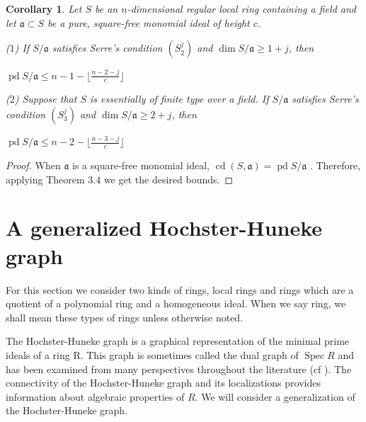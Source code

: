 \documentclass[11pt]{amsart}
\numberwithin{equation}{section}
\newtheorem{cor}[theorem]{Corollary}
\theoremstyle{definition}
\theoremstyle{remark}
\newcommand{\Spec}{\operatorname{Spec}}
\newcommand{\cd}{\operatorname{cd}}
\newcommand{\pd}{\operatorname{pd}}
\begin{document}

\begin{cor}
Let $S$ be an $n$-dimensional regular local ring containing a field and let $\mathfrak{a} \subset S$ be a pure, square-free monomial ideal of height $c$.

($1$) If $S/\mathfrak{a}$ satisfies Serre's condition $(S_2^j)$ and $\dim S/\mathfrak{a} \geq 1+j$, then

\begin{center}
$\pd S/\mathfrak{a} \leq n-1-\lfloor \frac{n-2-j}{c} \rfloor$
\end{center}

($2$) Suppose that $S$ is essentially of finite type over a field. If $S/\mathfrak{a}$ satisfies Serre's condition $(S_3^j)$ and $\dim S/\mathfrak{a} \geq 2+j$, then

\begin{center}
$\pd S/\mathfrak{a} \leq n-2-\lfloor \frac{n-3-j}{c} \rfloor$
\end{center}

\end{cor}

\begin{proof}

When $\mathfrak{a}$ is a square-free monomial ideal, $\cd (S,\mathfrak{a}) = \pd S/\mathfrak{a}$ \cite{Ly83}. Therefore, applying Theorem $3.4$ we get the desired bounds.
\end{proof}

\section{A generalized Hochster-Huneke graph}

For this section we consider two kinds of rings, local rings and rings which are a quotient of a polynomial ring and a homogeneous ideal.  When we say ring, we shall mean these types of rings unless otherwise noted.

The Hochster-Huneke graph is a graphical representation of the minimal prime ideals of a ring R.  This graph is sometimes called the dual graph of $\Spec R$ and has been examined from many perspectives throughout the literature (cf \cite{HH94,BB15,BV15,Ho16}).  The connectivity of the Hochster-Huneke graph and its localizations provides information about algebraic properties of $R$.  We will consider a generalization of the Hochster-Huneke graph.

 
\end{document}
